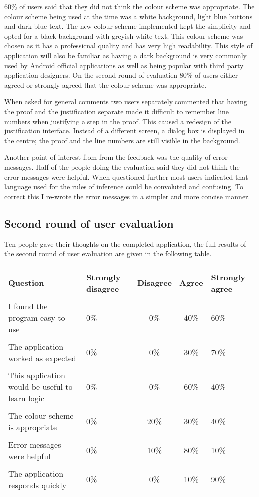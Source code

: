 60\% of users said that they did not think the colour scheme was appropriate. The colour scheme being used at the time was a white background, light blue buttons and dark blue text. The new colour scheme implemented kept the simplicity and opted for a black background with greyish white text. This colour scheme was chosen as it has a professional quality and has very high readability. This style of application will also be familiar as having a dark background is very commonly used by Android official applications as well as being popular with third party application designers. On the second round of evaluation 80\% of users either agreed or strongly agreed that the colour scheme was appropriate. 

When asked for general comments two users separately commented that having the proof and the justification separate made it difficult to remember line numbers when justifying a step in the proof.   This caused a redesign of the justification interface. Instead of a different screen, a dialog box is displayed in the centre; the proof  and the line numbers are still visible in the background.

Another point of interest from from the feedback was the quality of error messages. Half of the people doing the evaluation said they did not think the error messages were helpful. When questioned further most users indicated that language used for the rules of inference could be convoluted and confusing. To correct this I re-wrote the error messages in a simpler and more concise manner.

\subsection{Second round of user evaluation}
Ten people gave their thoughts on the completed application, the full results of the second round of user evaluation are given in the following table.
\begin{tabular}{p{2in} p{0.7in} c c p{0.55in} }
\hline 
\\
\bf{Question} & \bf{Strongly disagree} & \bf{Disagree} & \bf{Agree} & \bf{ Strongly agree }
\\
\hline 
\\
I found the program easy to use & 0\% & 0\% & 40\% & 60\%
\\ \hline \\
The application worked as expected & 0\% & 0\% & 30\% & 70\%
\\ \hline \\
This application would be useful to learn logic & 0\% & 0\% & 60\% & 40\%
\\ \hline \\
The colour scheme is appropriate & 0\% & 20\% & 30\% & 40\%
\\ \hline \\
Error messages were helpful & 0\% & 10\% & 80\% & 10\%
\\ \hline \\
The application responds quickly & 0\% & 0\% & 10\% & 90\%
\\
\hline
\end{tabular}




